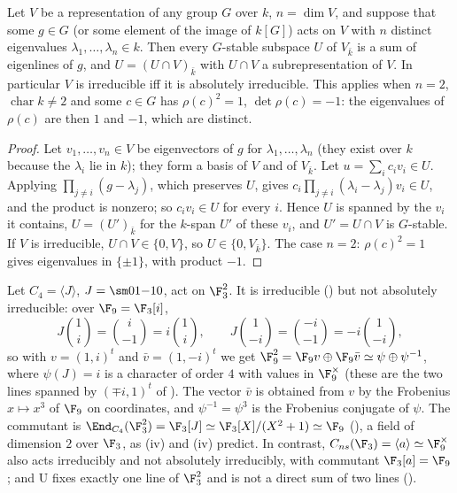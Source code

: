 \begin{proposition}\label{prop:reps:distinct-eigenvalues}
Let $V$ be a representation of any group $G$ over $k$, $n=\dim V$, and suppose that some $g\in G$ (or some element of the image of
$k[G]$) acts on $V$ with $n$ distinct eigenvalues $\lambda_1,\dots,\lambda_n\in k$. Then every $G$-stable subspace $U$ of $V_{\bar k}$ is a sum of
eigenlines of $g$, and $U=(U\cap V)_{\bar k}$ with $U\cap V$ a subrepresentation of $V$. In particular $V$ is irreducible iff it is absolutely
irreducible. This applies when $n=2$, $\operatorname{char}k\ne2$ and some $c\in G$ has $\rho(c)^2=1$, $\det\rho(c)=-1$: the eigenvalues of $\rho(c)$ are
then $1$ and $-1$, which are distinct.
\end{proposition}

\begin{proof}
Let $v_1,\dots,v_n\in V$ be eigenvectors of $g$ for $\lambda_1,\dots,\lambda_n$ (they exist over $k$ because the $\lambda_i$ lie in $k$); they form a basis of $V$
and of $V_{\bar k}$. Let $u=\sum_ic_iv_i\in U$. Applying $\prod_{j\ne i}(g-\lambda_j)$, which preserves $U$, gives $c_i\prod_{j\ne i}(\lambda_i-\lambda_j)v_i\in U$, and
the product is nonzero; so $c_iv_i\in U$ for every $i$. Hence $U$ is spanned by the $v_i$ it contains, $U=(U')_{\bar k}$ for the $k$-span $U'$
of these $v_i$, and $U'=U\cap V$ is $G$-stable. If $V$ is irreducible, $U\cap V\in\{0,V\}$, so $U\in\{0,V_{\bar k}\}$. The case $n=2$: $\rho(c)^2=1$
gives eigenvalues in $\{\pm1\}$, with product $-1$.
\end{proof}

\begin{example}[$C_4$ on $\F_3^2$]\label{ex:reps:c4}
Let $C_4=\langle J\rangle$, $J=\sm01{-1}0$, act on $\F_3^2$. It is irreducible () but not absolutely irreducible: over
$\F_9=\F_3[i]$,
\[
J\binom1i=\binom{i}{-1}=i\binom1i,\qquad J\binom1{-i}=\binom{-i}{-1}=-i\binom1{-i},
\]
so with $v=(1,i)^t$ and $\bar v=(1,-i)^t$ we get $\F_9^2=\F_9v\oplus\F_9\bar v\simeq\psi\oplus\psi^{-1}$, where $\psi(J)=i$ is a character of order $4$ with values
in $\F_9^\times$ (these are the two lines spanned by $(\mp i,1)^t$ of ). The vector $\bar v$ is obtained from $v$ by the Frobenius
$x\mapsto x^3$ of $\F_9$ on coordinates, and $\psi^{-1}=\psi^3$ is the Frobenius conjugate of $\psi$. The commutant is $\End_{C_4}(\F_3^2)=\F_3[J]\simeq\F_3[X]/(X^2+1)\simeq\F_9$
(), a field of dimension $2$ over $\F_3$, as (iv) and (iv) predict.
In contrast, $C_{ns}(\F_3)=\langle a\rangle\simeq\F_9^\times$ also acts irreducibly and not absolutely irreducibly, with commutant $\F_3[a]=\F_9$; and $\mathrm U$
fixes exactly one line of $\F_3^2$ and is not a direct sum of two lines ().
\end{example}

